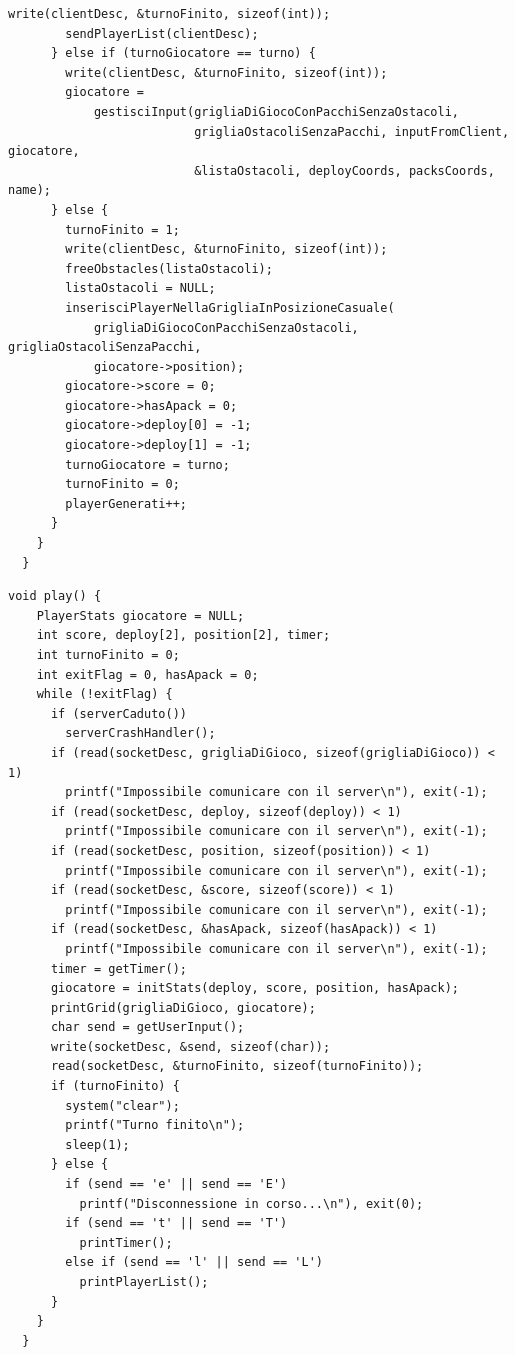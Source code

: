 \documentclass[a4paper]{article}
\begin{document}
\begin{lstlisting}[caption=Funzione play del server, label=alg:playServer]
        write(clientDesc, &turnoFinito, sizeof(int));
        sendPlayerList(clientDesc);
      } else if (turnoGiocatore == turno) {
        write(clientDesc, &turnoFinito, sizeof(int));
        giocatore =
            gestisciInput(grigliaDiGiocoConPacchiSenzaOstacoli,
                          grigliaOstacoliSenzaPacchi, inputFromClient, giocatore,
                          &listaOstacoli, deployCoords, packsCoords, name);
      } else {
        turnoFinito = 1;
        write(clientDesc, &turnoFinito, sizeof(int));
        freeObstacles(listaOstacoli);
        listaOstacoli = NULL;
        inserisciPlayerNellaGrigliaInPosizioneCasuale(
            grigliaDiGiocoConPacchiSenzaOstacoli, grigliaOstacoliSenzaPacchi,
            giocatore->position);
        giocatore->score = 0;
        giocatore->hasApack = 0;
        giocatore->deploy[0] = -1;
        giocatore->deploy[1] = -1;
        turnoGiocatore = turno;
        turnoFinito = 0;
        playerGenerati++;
      }
    }
  }  
\end{lstlisting}
\pagebreak
\begin{lstlisting}[caption=Funzione play del client, label=alg:playclient]
  void play() {
    PlayerStats giocatore = NULL;
    int score, deploy[2], position[2], timer;
    int turnoFinito = 0;
    int exitFlag = 0, hasApack = 0;
    while (!exitFlag) {
      if (serverCaduto())
        serverCrashHandler();
      if (read(socketDesc, grigliaDiGioco, sizeof(grigliaDiGioco)) < 1)
        printf("Impossibile comunicare con il server\n"), exit(-1);
      if (read(socketDesc, deploy, sizeof(deploy)) < 1)
        printf("Impossibile comunicare con il server\n"), exit(-1);
      if (read(socketDesc, position, sizeof(position)) < 1)
        printf("Impossibile comunicare con il server\n"), exit(-1);
      if (read(socketDesc, &score, sizeof(score)) < 1)
        printf("Impossibile comunicare con il server\n"), exit(-1);
      if (read(socketDesc, &hasApack, sizeof(hasApack)) < 1)
        printf("Impossibile comunicare con il server\n"), exit(-1);
      timer = getTimer();
      giocatore = initStats(deploy, score, position, hasApack);
      printGrid(grigliaDiGioco, giocatore);
      char send = getUserInput();
      write(socketDesc, &send, sizeof(char));
      read(socketDesc, &turnoFinito, sizeof(turnoFinito));
      if (turnoFinito) {
        system("clear");
        printf("Turno finito\n");
        sleep(1);
      } else {
        if (send == 'e' || send == 'E')
          printf("Disconnessione in corso...\n"), exit(0);
        if (send == 't' || send == 'T')
          printTimer();
        else if (send == 'l' || send == 'L')
          printPlayerList();
      }
    }
  }    
\end{lstlisting}
\appendix
\end{document}
